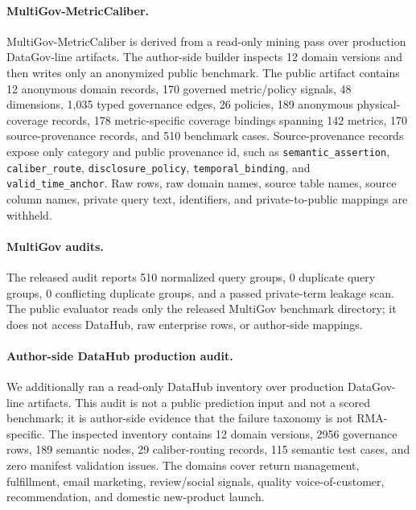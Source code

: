 \documentclass[letterpaper]{article}
\begin{document}
\paragraph{MultiGov-MetricCaliber.}
MultiGov-MetricCaliber is derived from a read-only mining pass over production DataGov-line artifacts. The author-side builder inspects 12 domain versions and then writes only an anonymized public benchmark. The public artifact contains 12 anonymous domain records, 170 governed metric/policy signals, 48 dimensions, 1,035 typed governance edges, 26 policies, 189 anonymous physical-coverage records, 178 metric-specific coverage bindings spanning 142 metrics, 170 source-provenance records, and 510 benchmark cases. Source-provenance records expose only category and public provenance id, such as \texttt{semantic\_\allowbreak{}assertion}, \texttt{caliber\_\allowbreak{}route}, \texttt{disclosure\_\allowbreak{}policy}, \texttt{temporal\_\allowbreak{}binding}, and \texttt{valid\_\allowbreak{}time\_\allowbreak{}anchor}. Raw rows, raw domain names, source table names, source column names, private query text, identifiers, and private-to-public mappings are withheld.

\paragraph{MultiGov audits.}
The released audit reports 510 normalized query groups, 0 duplicate query groups, 0 conflicting duplicate groups, and a passed private-term leakage scan. The public evaluator reads only the released MultiGov benchmark directory; it does not access DataHub, raw enterprise rows, or author-side mappings.

\paragraph{Author-side DataHub production audit.}
We additionally ran a read-only DataHub inventory over production DataGov-line artifacts. This audit is not a public prediction input and not a scored benchmark; it is author-side evidence that the failure taxonomy is not RMA-specific. The inspected inventory contains 12 domain versions, 2956 governance rows, 189 semantic nodes, 29 caliber-routing records, 115 semantic test cases, and zero manifest validation issues. The domains cover return management, fulfillment, email marketing, review/social signals, quality voice-of-customer, recommendation, and domestic new-product launch.
\end{document}
